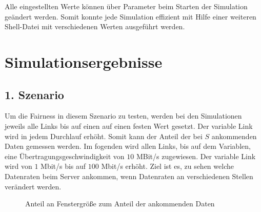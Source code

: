 \documentclass [10pt,a4paper]{article}
\begin{document}
	Alle eingestellten Werte können über Parameter beim Starten der Simulation geändert werden. Somit konnte jede Simulation effizient mit Hilfe einer weiteren Shell-Datei mit verschiedenen Werten ausgeführt werden.
	
\section{Simulationsergebnisse}
	\subsection{1. Szenario}
		Um die Fairness in diesem Szenario zu testen, werden bei den Simulationen jeweils alle Links bis auf einen auf einen festen Wert gesetzt. Der variable Link wird in jedem Durchlauf erhöht. Somit kann der Anteil der bei $S$ ankommenden Daten gemessen werden. Im fogenden wird allen Links, bis auf dem Variablen, eine Übertragungsgeschwindigkeit von $10$ MBit/s zugewiesen. Der variable Link wird von $1$ Mbit/s bis auf $100$ Mbit/s erhöht. Ziel ist es, zu sehen welche Datenraten beim Server ankommen, wenn Datenraten an verschiedenen Stellen verändert werden.
	
		\begin{figure}[[htb]
			\caption[Anteil an Fenstergröße zum Anteil der ankommenden Daten]{Anteil an Fenstergröße zum Anteil der ankommenden Daten}
			\label{fig:r-r2-incom}
		\end{figure}
		
\end{document}
